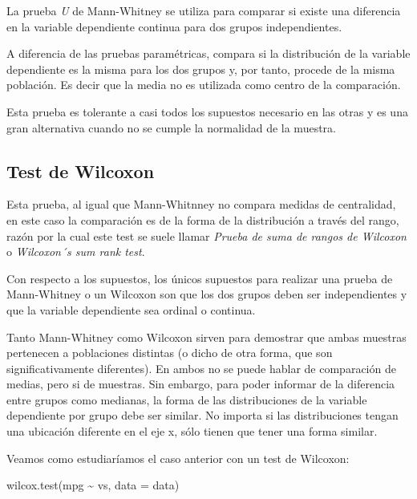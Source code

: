 \documentclass[
]{book}
\newenvironment{Shaded}{\begin{snugshade}}{\end{snugshade}}
\newcommand{\AttributeTok}[1]{\textcolor[rgb]{0.77,0.63,0.00}{#1}}
\newcommand{\FunctionTok}[1]{\textcolor[rgb]{0.00,0.00,0.00}{#1}}
\newcommand{\NormalTok}[1]{#1}
\newcommand{\SpecialCharTok}[1]{\textcolor[rgb]{0.00,0.00,0.00}{#1}}
\begin{document}
La prueba \emph{U} de Mann-Whitney se utiliza para comparar si existe una diferencia en la variable dependiente continua para dos grupos independientes.

A diferencia de las pruebas paramétricas, compara si la distribución de la variable dependiente es la misma para los dos grupos y, por tanto, procede de la misma población. Es decir que la media no es utilizada como centro de la comparación.

Esta prueba es tolerante a casi todos los supuestos necesario en las otras y es una gran alternativa cuando no se cumple la normalidad de la muestra.

\hypertarget{test-de-wilcoxon}{%
\subsection{Test de Wilcoxon}\label{test-de-wilcoxon}}

Esta prueba, al igual que Mann-Whitnney no compara medidas de centralidad, en este caso la comparación es de la forma de la distribución a través del rango, razón por la cual este test se suele llamar \emph{Prueba de suma de rangos de Wilcoxon} o \emph{Wilcoxon´s sum rank test}.

Con respecto a los supuestos, los únicos supuestos para realizar una prueba de Mann-Whitney o un Wilcoxon son que los dos grupos deben ser independientes y que la variable dependiente sea ordinal o continua.

Tanto Mann-Whitney como Wilcoxon sirven para demostrar que ambas muestras pertenecen a poblaciones distintas (o dicho de otra forma, que son significativamente diferentes). En ambos no se puede hablar de comparación de medias, pero si de muestras. Sin embargo, para poder informar de la diferencia entre grupos como medianas, la forma de las distribuciones de la variable dependiente por grupo debe ser similar. No importa si las distribuciones tengan una ubicación diferente en el eje x, sólo tienen que tener una forma similar.

Veamos como estudiaríamos el caso anterior con un test de Wilcoxon:

\begin{Shaded}
\begin{Highlighting}[]
\FunctionTok{wilcox.test}\NormalTok{(mpg }\SpecialCharTok{\textasciitilde{}}\NormalTok{ vs, }\AttributeTok{data =}\NormalTok{ data)}
\end{Highlighting}
\end{Shaded}
\end{document}
